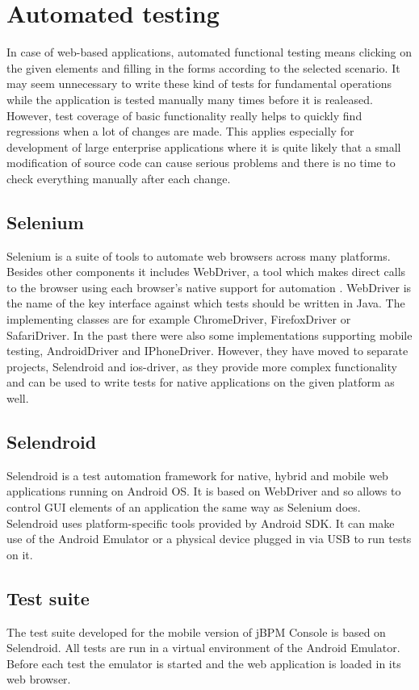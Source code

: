 \documentclass[12pt,oneside,final]{fithesis2}
\begin{document}
\section{Automated testing}
In case of web-based applications, automated functional testing means clicking on the given elements and filling in the forms according to the selected scenario.
It may seem unnecessary to write these kind of tests for fundamental operations while the application is tested manually many times before it is realeased.
However, test coverage of basic functionality really helps to quickly find regressions when a lot of changes are made.
This applies especially for development of large enterprise applications where it is quite likely that a small modification of source code can cause serious problems and there is no time to check everything manually after each change.

\subsection{Selenium}
Selenium is a suite of tools to automate web browsers across many platforms.
Besides other components it includes WebDriver, a tool which makes direct calls to the browser using each browser’s native support for automation \cite{webdriver}.
WebDriver is the name of the key interface against which tests should be written in Java.
The implementing classes are for example ChromeDriver, FirefoxDriver or SafariDriver.
In the past there were also some implementations supporting mobile testing, AndroidDriver and IPhoneDriver.
However, they have moved to separate projects, Selendroid\footnotemark{} and ios-driver\footnotemark{}, as they provide more complex functionality and can be used to write tests for native applications on the given platform as well.

\subsection{Selendroid}
Selendroid is a test automation framework for native, hybrid and mobile web applications running on Android OS.
It is based on WebDriver and so allows to control GUI elements of an application the same way as Selenium does.
Selendroid uses platform-specific tools provided by Android SDK.
It can make use of the Android Emulator or a physical device plugged in via USB to run tests on it.

\subsection{Test suite}
\label{subsec:test-suite}
The test suite developed for the mobile version of jBPM Console is based on Selendroid.
All tests are run in a virtual environment of the Android Emulator.
Before each test the emulator is started and the web application is loaded in its web browser.
\end{document}
